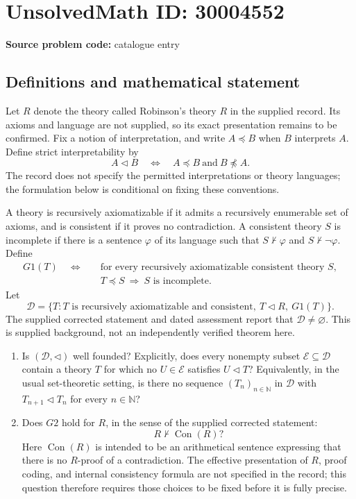 \documentclass[11pt]{article}
\newcommand{\N}{\mathbb{N}}
\begin{document}
\section*{UnsolvedMath ID: 30004552}
\textbf{Source problem code:} catalogue entry
\subsection{Definitions and mathematical statement}
Let \(R\) denote the theory called Robinson's theory \(R\) in the supplied record. Its axioms and language are not supplied, so its exact presentation remains to be confirmed. Fix a notion of interpretation, and write \(A\preccurlyeq B\) when \(B\) interprets \(A\). Define strict interpretability by
\[
A\lhd B\quad\Longleftrightarrow\quad A\preccurlyeq B\ \text{and}\ B\not\preccurlyeq A.
\]
The record does not specify the permitted interpretations or theory languages; the formulation below is conditional on fixing these conventions.

A theory is recursively axiomatizable if it admits a recursively enumerable set of axioms, and is consistent if it proves no contradiction. A consistent theory \(S\) is incomplete if there is a sentence \(\varphi\) of its language such that \(S\nvdash\varphi\) and \(S\nvdash\neg\varphi\). Define
\[
\begin{aligned}
G1(T)\quad\Longleftrightarrow\quad
&\text{for every recursively axiomatizable consistent theory }S,\\
&T\preccurlyeq S\ \Longrightarrow\ S\text{ is incomplete}.
\end{aligned}
\]
Let
\[
\mathcal D=\{T:T\text{ is recursively axiomatizable and consistent},\ T\lhd R,\ G1(T)\}.
\]
The supplied corrected statement and dated assessment report that \(\mathcal D\neq\varnothing\). This is supplied background, not an independently verified theorem here.

\begin{enumerate}
\item Is \((\mathcal D,\lhd)\) well founded? Explicitly, does every nonempty subset \(\mathcal E\subseteq\mathcal D\) contain a theory \(T\) for which no \(U\in\mathcal E\) satisfies \(U\lhd T\)? Equivalently, in the usual set-theoretic setting, is there no sequence \((T_n)_{n\in\N}\) in \(\mathcal D\) with \(T_{n+1}\lhd T_n\) for every \(n\in\N\)?
\item Does \(G2\) hold for \(R\), in the sense of the supplied corrected statement:
\[
R\nvdash\operatorname{Con}(R)?
\]
Here \(\operatorname{Con}(R)\) is intended to be an arithmetical sentence expressing that there is no \(R\)-proof of a contradiction. The effective presentation of \(R\), proof coding, and internal consistency formula are not specified in the record; this question therefore requires those choices to be fixed before it is fully precise.
\end{enumerate}
\end{document}
